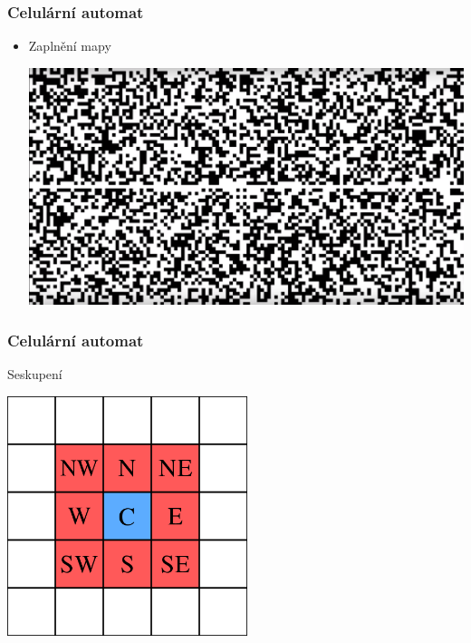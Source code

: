 \documentclass{beamer}
\begin{document}
\begin{frame}
	\frametitle{Celulární automat}
	\begin{itemize}
		\item Zaplnění mapy
		\begin{center}		
			\includegraphics[width=\linewidth]{celular-ex2.png}	
		\end{center}	
	\end{itemize}
\end{frame}
\begin{frame}
	\frametitle{Celulární automat}
	\begin{itemize}
		\item Seskupení
		\begin{center}
			\item
			\includegraphics[width=7cm]{moore-n.png}	
		\end{center}
	\end{itemize}	
\end{frame}
\end{document}
